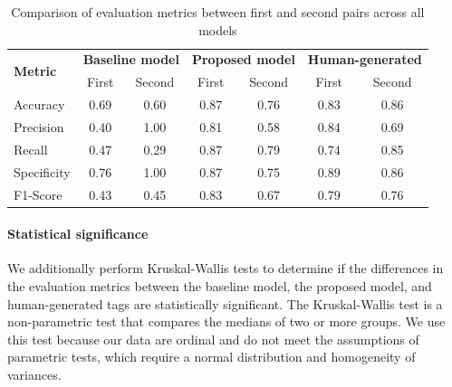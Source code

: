 \begin{table}[h]
    \centering
    \begin{tabular}{lcccccc}
        \hline
        \multirow{2}{*}{\textbf{Metric}} & \multicolumn{2}{c}{\textbf{Baseline model}} & \multicolumn{2}{c}{\textbf{Proposed model}} & \multicolumn{2}{c}{\textbf{Human-generated}}                           \\
        \cline{2-7}
                                         & First                                 & Second                                      & First                                        & Second & First & Second \\
        \hline
        Accuracy                         & 0.69                                  & 0.60                                        & 0.87                                         & 0.76   & 0.83  & 0.86   \\
        Precision                        & 0.40                                  & 1.00                                        & 0.81                                         & 0.58   & 0.84  & 0.69   \\
        Recall                           & 0.47                                  & 0.29                                        & 0.87                                         & 0.79   & 0.74  & 0.85   \\
        Specificity                      & 0.76                                  & 1.00                                        & 0.87                                         & 0.75   & 0.89  & 0.86   \\
        F1-Score                         & 0.43                                  & 0.45                                        & 0.83                                         & 0.67   & 0.79  & 0.76   \\
        \hline
    \end{tabular}
    \caption{Comparison of evaluation metrics between first and second pairs across all models}
    \label{tab:metrics_comparison_combined}
\end{table}

\paragraph{Statistical significance}
We additionally perform Kruskal-Wallis tests to determine if the differences in the evaluation metrics between the baseline model, the proposed model, and human-generated tags are statistically significant. The Kruskal-Wallis test is a non-parametric test that compares the medians of two or more groups. We use this test because our data are ordinal and do not meet the assumptions of parametric tests, which require a normal distribution and homogeneity of variances.

